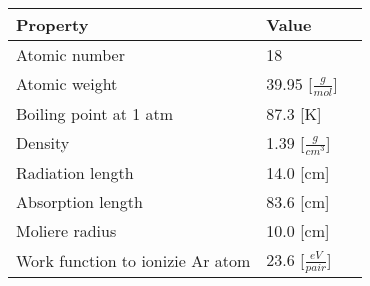 \begin{minipage}{\linewidth}
\centering
{} 
 \begin{tabular}{| l | l | l |}
 \hline
 Property & Value \\ [0.1ex] \hline \hline 
 Atomic number & 18 \\ \hline
 Atomic weight & 39.95 [$\frac{g}{mol}$] \\ \hline
 Boiling point at 1 atm & 87.3 [K] \\ \hline
 Density & 1.39 [$\frac{g}{cm^3}$] \\ \hline
 Radiation length & 14.0 [cm] \\ \hline
Absorption length & 83.6 [cm] \\ \hline
 Moliere radius & 10.0 [cm] \\ \hline 
 Work function to ionizie Ar atom  & 23.6 [$\frac{eV}{pair}$] \\
\hline
\end{tabular}
\end{minipage}



